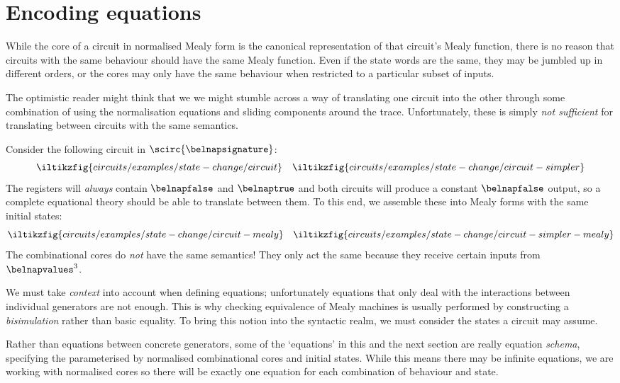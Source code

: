 \section{Encoding equations}

While the core of a circuit in normalised Mealy form is the canonical
representation of that circuit's Mealy function, there is no reason that
circuits with the same behaviour should have the same Mealy function.
Even if the state words are the same, they may be jumbled up in different
orders, or the cores may only have the same behaviour when restricted to a
particular subset of inputs.

The optimistic reader might think that we we might stumble across a way of
translating one circuit into the other through some combination of using the
normalisation equations and sliding components around the trace.
Unfortunately, these is simply \emph{not sufficient} for translating between
circuits with the same semantics.

\begin{example}
    Consider the following circuit in \(\scirc{\belnapsignature}\): \[
        \iltikzfig{circuits/examples/state-change/circuit}
        \quad
        \iltikzfig{circuits/examples/state-change/circuit-simpler}
    \]
    The registers will \emph{always} contain
    \(\belnapfalse\) and \(\belnaptrue\) and both circuits will
    produce a constant \(\belnapfalse\) output, so a complete equational theory
    should be able to translate between them.
    To this end, we assemble these into Mealy forms with the same initial states:
    \[
        \iltikzfig{circuits/examples/state-change/circuit-mealy}
        \quad
        \iltikzfig{circuits/examples/state-change/circuit-simpler-mealy}
    \]
    The combinational cores do \emph{not} have the same semantics!
    They only act the same because they receive certain inputs
    from \(\belnapvalues^{3}\).
\end{example}

We must take \emph{context} into account when defining
equations; unfortunately equations that only deal with the interactions between
individual generators are not enough.
This is why checking equivalence of Mealy machines is usually performed by
constructing a \emph{bisimulation} rather than basic equality.
To bring this notion into the syntactic realm, we must consider the states a
circuit may assume.

\begin{remark}
    Rather than equations between concrete generators, some of the `equations'
    in this and the next section are really equation \emph{schema}, specifying
    the   parameterised by normalised
    combinational cores and initial states.
    While this means there may be infinite equations, we are working with
    normalised cores so there will be exactly one equation for each combination
    of behaviour and state.
\end{remark}

